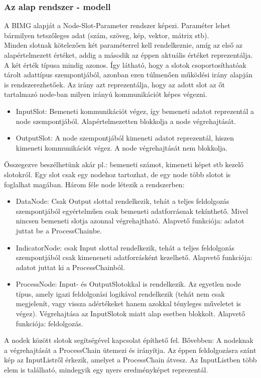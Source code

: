 \documentclass[a4paper,12pt,oneside]{report}
\begin{document}
\subsubsection{Az alap rendszer - modell}
A BIMG alapját a Node-Slot-Parameter rendszer képezi. Paraméter lehet bármilyen tetszőleges adat (szám, szöveg, kép, vektor, mátrix stb).\\ Minden slotnak kötelezően két paraméterrel kell rendelkeznie, amíg az első az alapértelmezett értéket, addig a második az éppen aktuális értéket reprezentálja. A két érték típusa mindig azonos. Így látható, hogy a slotok csoportosíthatóak  tárolt adattípus szempontjából, azonban ezen túlmenően működési irány alapján is rendszerezhetőek. Az irány azt reprezentálja, hogy az adott slot az őt tartalmazó node-ban milyen irányú kommunikációt képes végezni.
\begin{itemize}
	\itemsep0em
	\item InputSlot: Bemeneti kommunikációt végez, így bemeneti adatot reprezentál a node szempontjából. Alapértelmezetten blokkolja a node végrehajtását.
	\item OutputSlot: A node szempontjából kimeneti adatot reprezentál, hiszen kimeneti kommunikációt végez. A node végrehajtását nem blokkolja.
\end{itemize}
Összegezve beszélhetünk akár pl.: bemeneti számot, kimeneti képet stb kezelő slotokról. Egy slot csak egy nodehoz tartozhat, de egy node több slotot is foglalhat magában.
Három féle node létezik a rendszerben:
\begin{itemize}
	\itemsep0em
	\item DataNode: Csak Output slottal rendelkezik, tehát a teljes feldolgozás szempontjából egyértelműen csak bemeneti adatforrásnak tekínthető. Mivel nincsen bemeneti slotja azonnal végrehajtható. Alapvető funkciója: adatot juttat be a ProcessChainbe.
	\item IndicatorNode: csak Input slottal rendelkezik, tehát a teljes feldolgozás szempontjából csak kimeneneti adatforrásként kezelhető. Alapvető funkciója: adatot juttat ki a ProcessChainból.
	\item ProcessNode: Input- és OutputSlotokkal is rendelkezik. Az egyetlen node típus, amely igazi feldolgozási logikával rendelkezik (tehát nem csak megjelenít, vagy vissza adértékeket hanem azokkal tényleges műveletet is végez). Végrehajtása az InputSlotok miatt alap esetben blokkolt. Alapvető funkciója: feldolgozás.

\end{itemize}
A nodek között slotok segítségével kapcsolat építhető fel. Bővebben:  A nodeknak a végrehajtását a ProcessChain ütemezi és irányítja. Az éppen feldolgozásra szánt kép az InputListről érkezik, amelyet a ProcessChain átvesz. Az InputListben több elem is található, mindegyik egy nyers eredményképet reprezentál.\\
\end{document}
